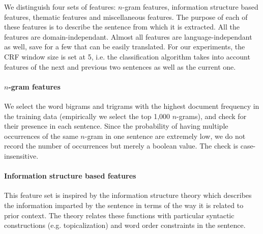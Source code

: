 We distinguish four sets of features:  $n$-gram features, information structure based features, thematic features and miscellaneous features.
The purpose of each of these features is to describe the sentence from which it is extracted.
All the features are domain-independant. Almost all features are language-independant as well, save for a few that can be easily translated.
For our experiments, the CRF window size is set at 5, i.e. the classification algorithm takes into account features of the next and previous two sentences as well as the current one.



\paragraph{$n$-gram features}
%
We select the word bigrams and trigrams with the highest document frequency in the training data (empirically we select the top 1,000 $n$-grams), and check for their presence in each sentence. Since the probability of having multiple occurrences of the same $n$-gram in one sentence are extremely low, we do not record the number of occurrences but merely a boolean value. The check is case-insensitive.


\paragraph{Information structure based features}

This feature set is inspired by the information structure theory \cite{kruijff:1996} which 
describes the information imparted by the sentence in terms of the way it is related to prior context. %
 The theory relates these functions with particular syntactic constructions (e.g. topicalization) and word order constraints in the sentence.
%

